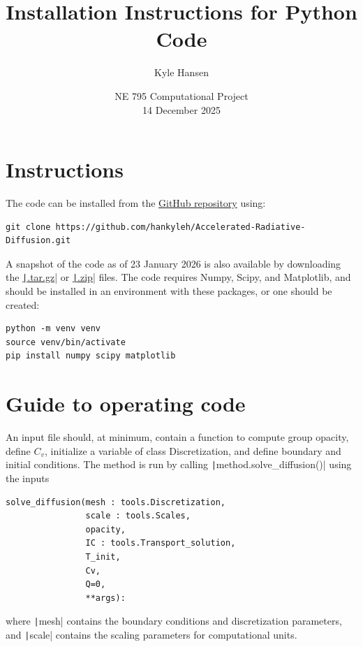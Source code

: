 \documentclass{template}
\title{Installation Instructions for Python Code}
\author{Kyle Hansen}
\date{NE 795 Computational Project\\
14 December 2025}
\begin{document}
\maketitle

\section{Instructions}

The code can be installed from the \href{https://github.com/hankyleh/Accelerated-Radiative-Diffusion#}{GitHub repository} using:

\begin{verbatim}
git clone https://github.com/hankyleh/Accelerated-Radiative-Diffusion.git
\end{verbatim}

A snapshot of the code as of 23 January 2026 is also available by downloading the \href{https://github.com/hankyleh/Accelerated-Radiative-Diffusion/archive/refs/tags/1_23_2026.tar.gz}{\texttt|.tar.gz|} or \href{https://github.com/hankyleh/Accelerated-Radiative-Diffusion/archive/refs/tags/1_23_2026.zip}{\texttt|.zip|} files.
The code requires Numpy, Scipy, and Matplotlib, and should be installed in an environment with these packages, or one should be created:

\begin{verbatim}
python -m venv venv
source venv/bin/activate
pip install numpy scipy matplotlib
\end{verbatim}


\section{Guide to operating code}

An input file should, at minimum, contain a function to compute group opacity, define $C_v$, initialize a variable of class Discretization, and define boundary and initial conditions. The method is run by calling \texttt|method.solve_diffusion()| using the inputs

\begin{verbatim}
solve_diffusion(mesh : tools.Discretization, 
                scale : tools.Scales, 
                opacity, 
                IC : tools.Transport_solution, 
                T_init, 
                Cv, 
                Q=0, 
                **args):
\end{verbatim}

where \texttt|mesh| contains the boundary conditions and discretization parameters, and \texttt|scale| contains the scaling parameters for computational units.
\end{document}
